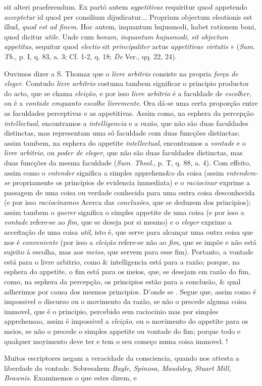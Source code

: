 sit alteri praeferendum. Ex partó autem \emph{aypetitivae} requiritur quod appetendo \emph{acceptetur} id quod per consilium dijudicatur... Proprium objectum eleotionis est illud, \emph{quod est ad finem}. Hoc autem, inquantum hujusmodi, habet rationem boni, quod dicitur \emph{utile}. Unde cum \emph{bonum}, \emph{inquantum hujusmodi}, \emph{sit objectum appetitus}, sequitur quod \emph{electio} sit \emph{principaliter} actus \emph{appetitivae virtutis} » (\emph{Sum}. \emph{Th}., p. I, q. 83, a. 3; Cf. 1-2, q. 18; \emph{De} Ver., qq. 22, 24).\par Ouvimos dizer a S. Thomaz que o \emph{livre arbitrio} consiste na propria \emph{força de eleger}. Comtudo \emph{livre arbitrio} costuma tambem significar o principio productor do acto, que se chama \emph{eleição}, e por isso \emph{livre arbitrio} é a faculdade de \emph{escolher}, ou é a \emph{vontade emquanto escolhe livremente}. Ora dá-se uma certa proporção entre as faculdades perceptivas e as appetitivas. Assim como, na esphera da percepção \emph{intellectual}, encontramos a \emph{intelligencia} e a \emph{razão}, que não são duas faculdades distinctas, mas representam uma só faculdade com duas funcções distinctas; assim tambem, na esphera do appetite \emph{intellectual}, encontramos a \emph{vontade} e o \emph{livre arbitrio}, ou \emph{poder de eleger}, que não são duas faculdades distinctas, mas duas funcções da mesma faculdade (\emph{Sum}. \emph{Theol}., p. T, q. 88, a. 4). Com effeito, assim como o \emph{entender} significa a simples apprehens\&o da coisa (assim \emph{entendem-se} propriamente os principios de evidencia immediata) e o \emph{raciocinar} exprime a passagem de uma coisa ou verdade conhecida para uma outra coisa desconhecida (e por isso \emph{raciocinamos} Acerca das \emph{conclusões}, que se deduzem dos principios); assim tambem o \emph{querer} significa o simples appetite de uma coisa (e por isso a \emph{vontade} refere-se ao \emph{fim}, que se deseja por si mesmo) e o \emph{eleger} exprime a acceitação de uma coisa \emph{util}, isto é, que serve para alcançar uma outra coisa que nos é \emph{conveniente} (por isso a \emph{eleição} refere-se não ao \emph{fim}, que se impõe e não está sujeito á escolha, mas aos \emph{meios}, que servem para esse fim). Portanto, a vontade está para o livre arbitrio, como \& intelligencia está para a razão; porque, na esphera do appetite, o fim está para os meios, que, se desejam em razão do fim, como, na esphera da percepção, os principios estão para a conclusão, \& qual adherimos por causa dos mesmos principios. D'onde se . Segue que, assim como é impossivel o discurso ou o movimento da razão, se não o precede alguma coisa immovel, que é o principio, percebido sem raciocinio mas por simples apprehensao, assim é impossivel a \emph{eleição}, ou o movimento do appetite para os meios, se não o precede o simples appetite ou vontade do fim; porque todo e qualquer moyimento deve ter e tem o seu começo numa coisa immovel. ! \textbar{}\par Muitos escriptores negam a veracidade da consciencia, quando nos attesta a liberdade da vontade. Sobresahem \emph{Bayle}, \emph{Spinosa}, \emph{Maudsley}, \emph{Stuart Mill}, \emph{Beawnis}. Examinemos o que estes dizem, e 